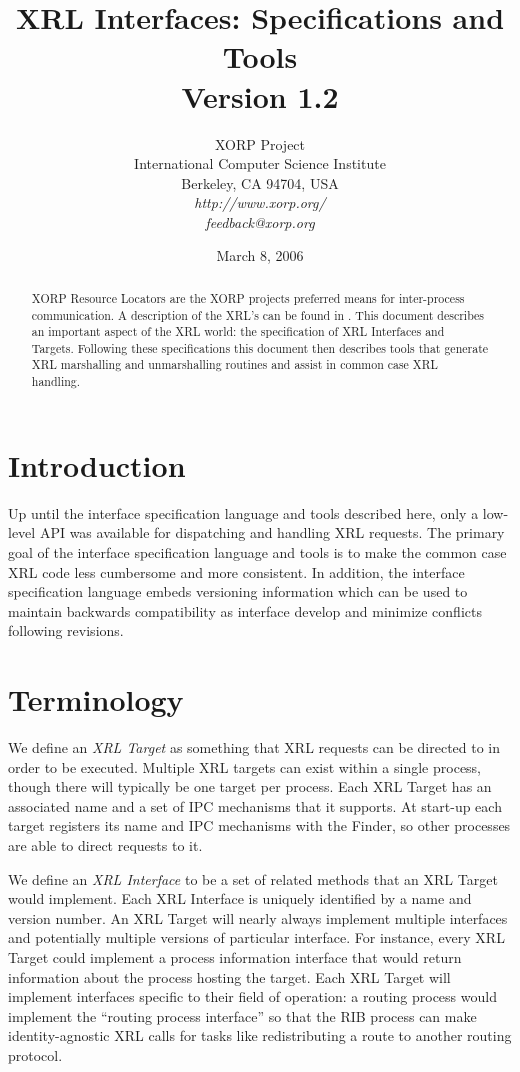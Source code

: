 \documentclass[11pt]{article}
\title{
XRL Interfaces: Specifications and Tools \\
\vspace{1ex} Version 1.2
}
\author{ XORP Project					\\
	 International Computer Science Institute	\\
	 Berkeley, CA 94704, USA			\\
         {\it http://www.xorp.org/}			\\
	 {\it feedback@xorp.org}
}
\date{March 8, 2006}
\begin{document}
\maketitle

\begin{abstract}
XORP Resource Locators are the XORP projects preferred means for
inter-process communication.  A description of the XRL's can be found
in \cite{xorp:xrl}.  This document describes an important aspect of the XRL
world: the specification of XRL Interfaces and Targets.  Following
these specifications this document then describes tools that generate
XRL marshalling and unmarshalling routines and assist in common case
XRL handling.
\end{abstract}

\section{Introduction}

Up until the interface specification language and tools described
here, only a low-level API was available for dispatching and handling
XRL requests.  The primary goal of the interface specification
language and tools is to make the common case XRL code less cumbersome
and more consistent.  In addition, the interface specification
language embeds versioning information which can be used to maintain
backwards compatibility as interface develop and minimize conflicts
following revisions.

\section{Terminology}

We define an \emph{XRL Target} as something that XRL requests can be
directed to in order to be executed.  Multiple XRL targets can
exist within a single process, though there will typically be one
target per process.  Each XRL Target has an associated name and a set
of IPC mechanisms that it supports.  At start-up each target registers
its name and IPC mechanisms with the Finder, so other processes are
able to direct requests to it.

We define an \emph{XRL Interface} to be a set of related methods that
an XRL Target would implement.  Each XRL Interface is uniquely
identified by a name and version number.  An XRL Target will nearly
always implement multiple interfaces and potentially multiple versions
of particular interface.  For instance, every XRL Target could
implement a process information interface that would return
information about the process hosting the target.  Each XRL Target
will implement interfaces specific to their field of operation: a
routing process would implement the ``routing process interface'' so
that the RIB process can make identity-agnostic XRL calls for tasks
like redistributing a route to another routing protocol.
\end{document}
